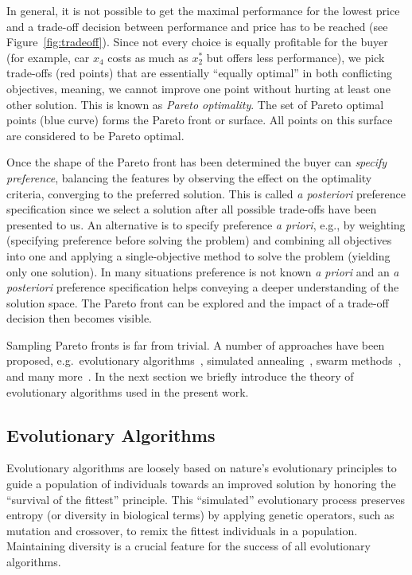 \documentclass[%
reprint,
amsmath,amssymb,
aps,
]{revtex4-1}
\begin{document}
In general, it is not possible to get the maximal performance for the lowest
  price and a trade-off decision between performance and price has to be
  reached (see Figure~\ref{fig:tradeoff}).
Since not every choice is equally profitable for the buyer (for example, car
  $x_4$ costs as much as $x_2^*$ but offers less performance), we pick
  trade-offs (red points) that are essentially ``equally optimal'' in both
  conflicting objectives, meaning, we cannot improve one point without hurting
  at least one other solution.
This is known as \textit{Pareto optimality}.
The set of Pareto optimal points (blue curve) forms the Pareto front or
  surface.
All points on this surface are considered to be Pareto optimal.

Once the shape of the Pareto front has been determined the buyer can
  \textit{specify preference}, balancing the features by observing the
  effect on the optimality criteria, converging to the preferred solution.
This is called \textit{a posteriori} preference specification since we select
  a solution after all possible trade-offs have been presented to us.
An alternative is to specify preference \textit{a priori}, e.g., by
  weighting (specifying preference before solving the problem) and combining
  all objectives into one and applying a single-objective method to solve the
  problem (yielding only one solution).
In many situations preference is not known \textit{a priori} and an
  \textit{a posteriori} preference specification helps conveying a deeper
  understanding of the solution space.
The Pareto front can be explored and the impact of a trade-off decision then
  becomes visible.

Sampling Pareto fronts is far from trivial.
A number of approaches have been proposed,
  e.g.\ evolutionary algorithms~\cite{deb:09},
  simulated annealing~\cite{kigv:83},
  swarm methods~\cite{keeb:95},
  and many more~\cite{domc:96,cati:02,kara:05,hoss:09}.
In the next section we briefly introduce the theory of evolutionary algorithms
  used in the present work.


\subsection{Evolutionary Algorithms}

Evolutionary algorithms are loosely based on nature's evolutionary
  principles to guide a population of individuals towards an improved solution
  by honoring the ``survival of the fittest'' principle.
This ``simulated'' evolutionary process preserves entropy (or diversity in
  biological terms) by applying genetic operators, such as mutation and
  crossover, to remix the fittest individuals in a population.
Maintaining diversity is a crucial feature for the success of all evolutionary
  algorithms.
\end{document}
